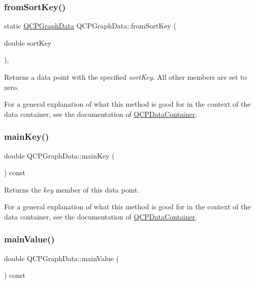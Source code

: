 \subsubsection{\texorpdfstring{from\+Sort\+Key()}{fromSortKey()}}
{\footnotesize\ttfamily static \hyperlink{class_q_c_p_graph_data}{Q\+C\+P\+Graph\+Data} Q\+C\+P\+Graph\+Data\+::from\+Sort\+Key (\begin{DoxyParamCaption}\item[{double}]{sort\+Key }\end{DoxyParamCaption})\hspace{0.3cm}{\ttfamily [inline]}, {\ttfamily [static]}}

Returns a data point with the specified {\itshape sort\+Key}. All other members are set to zero.

For a general explanation of what this method is good for in the context of the data container, see the documentation of \hyperlink{class_q_c_p_data_container}{Q\+C\+P\+Data\+Container}. \mbox{\label{class_q_c_p_graph_data_a72fdaf738f679ef93bea3d552ba42d1b}} 
\subsubsection{\texorpdfstring{main\+Key()}{mainKey()}}
{\footnotesize\ttfamily double Q\+C\+P\+Graph\+Data\+::main\+Key (\begin{DoxyParamCaption}{ }\end{DoxyParamCaption}) const\hspace{0.3cm}{\ttfamily [inline]}}

Returns the {\itshape key} member of this data point.

For a general explanation of what this method is good for in the context of the data container, see the documentation of \hyperlink{class_q_c_p_data_container}{Q\+C\+P\+Data\+Container}. \mbox{\label{class_q_c_p_graph_data_a1b1e440a430a4a83d9a3f6f247510f27}} 
\subsubsection{\texorpdfstring{main\+Value()}{mainValue()}}
{\footnotesize\ttfamily double Q\+C\+P\+Graph\+Data\+::main\+Value (\begin{DoxyParamCaption}{ }\end{DoxyParamCaption}) const\hspace{0.3cm}{\ttfamily [inline]}}

